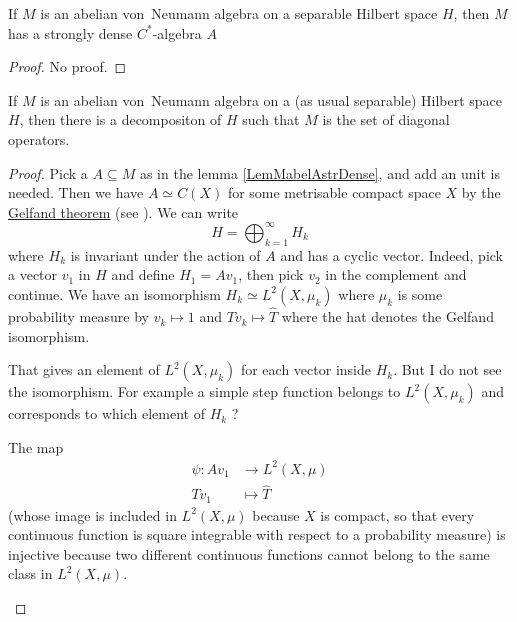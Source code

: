 \begin{lemma}		\label{LemMabelAstrDense}
If $M$ is an abelian von~Neumann algebra on a separable Hilbert space $H$, then $M$ has a strongly dense $C^*$-algebra $A$
\end{lemma}

\begin{proof}
No proof.
\end{proof}

\begin{theorem}		\label{ThoVNableHDiag}
If $M$ is an abelian von~Neumann algebra on a (as usual separable) Hilbert space $H$, then there is a decompositon of $H$ such that $M$ is the set of diagonal operators.
\end{theorem}

\begin{proof}
	Pick a $A\subseteq M$ as in the lemma \ref{LemMabelAstrDense}, and add an unit is needed. Then we have $A\simeq C(X)$ for some metrisable compact space $X$ by the
	\href{http://en.wikipedia.org/wiki/Gelfand_isomorphism}{Gelfand theorem} (see \cite{Landsman}). We can write 
	\begin{equation}
		H=\bigoplus_{k=1}^{\infty}H_k
	\end{equation}
	where $H_k$ is invariant under the action of $A$ and has a cyclic vector. Indeed, pick a vector $v_1$ in $H$ and define $H_1=Av_1$, then pick $v_2$ in the complement and continue. We have an isomorphism $H_k\simeq L^2(X,\mu_k)$ where $\mu_k$ is some probability measure by $v_k\mapsto 1$ and $Tv_k\mapsto\hat T$ where the hat denotes the Gelfand isomorphism.

	\begin{probleme}
		That gives an element of $L^2(X,\mu_k)$ for each vector inside $H_k$. But I do not see the isomorphism. For example a simple step function belongs to $L^2(X,\mu_k)$ and corresponds to which element of $H_k$ ?

		The map
		\begin{equation}
			\begin{aligned}
			 \psi\colon Av_1&\to L^2(X,\mu) \\ 
			   Tv_1&\mapsto \hat T 
			\end{aligned}
			\end{equation}
		(whose image is included in $L^2(X,\mu)$ because $X$ is compact, so that every continuous function is square integrable with respect to a probability measure) is injective because two different continuous functions cannot belong to the same class in $L^2(X,\mu)$. 


\end{probleme}
\end{proof}
